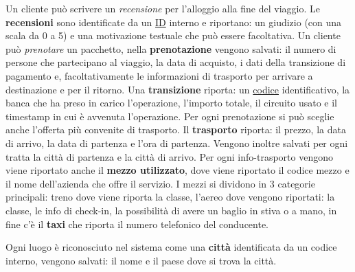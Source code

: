 Un cliente può scrivere un \emph{recensione} per l'alloggio alla fine del viaggio. Le \textbf{recensioni} sono identificate da un \underline{ID} interno e riportano: un giudizio (con una scala da 0 a 5) e una motivazione testuale che può essere facoltativa. Un cliente può \emph{prenotare} un pacchetto, nella \textbf{prenotazione} vengono salvati: il numero di persone che partecipano al viaggio, la data di acquisto, i dati della transizione di pagamento e, facoltativamente le informazioni di trasporto per arrivare a destinazione e per il ritorno. Una \textbf{transizione} riporta: un \underline{codice} identificativo, la banca che ha preso in carico l'operazione, l'importo totale, il circuito usato e il timestamp in cui è avvenuta l'operazione. Per ogni prenotazione si può sceglie anche l'offerta più convenite di trasporto. Il \textbf{trasporto} riporta: il prezzo, la data di arrivo, la data di partenza e l'ora di partenza. Vengono inoltre salvati per ogni tratta la città di partenza e la città di arrivo. Per ogni info-trasporto vengono viene riportato anche il \textbf{mezzo utilizzato}, dove viene riportato il codice mezzo e il nome dell'azienda che offre il servizio. I mezzi si dividono in 3 categorie principali: treno dove viene riporta la classe, l'aereo dove vengono riportati: la classe, le info di check-in, la possibilità di avere un baglio in stiva o a mano, in fine c'è il \textbf{taxi} che riporta il numero telefonico del conducente.

Ogni luogo è riconosciuto nel sistema come una \textbf{città} identificata da un codice interno, vengono salvati: il nome e il paese dove si trova la città.


